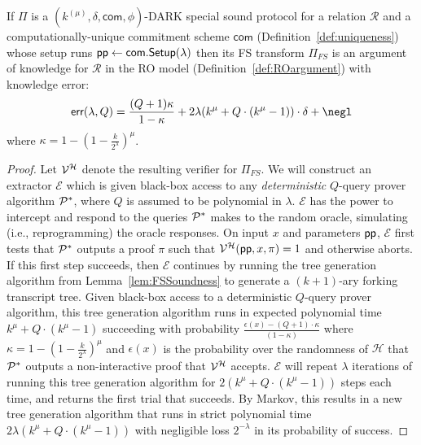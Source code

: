 \begin{theorem}
	If $\Pi$ is a $(k^{(\mu)}, \delta, \textsf{com} , \phi)$-DARK special sound protocol for a relation $\mathcal{R}$ and a computationally-unique commitment scheme $\textsf{com}$ (Definition~\ref{def:uniqueness}) whose setup runs $\textsf{pp} \gets \textsf{com}.\textsf{{Setup}}(\lambda)$ then its FS transform $\Pi_{FS}$ is an argument of knowledge for $\mathcal{R}$ in the RO model (Definition~\ref{def:ROargument}) with knowledge error: 
	 $$\textsf{err}(\lambda, Q) = \frac{(Q+1)\kappa}{1- \kappa}  + 2\lambda (k^\mu + Q \cdot (k^\mu - 1)) \cdot \delta + \negl
 $$ where $\kappa = 1 - (1 - \frac{k}{2^\lambda})^\mu$.
	\end{theorem}
	\begin{proof}
	Let $\mathcal{V}^\mathcal{H}$ denote the resulting verifier for $\Pi_{FS}$. We will construct an extractor $\mathcal{E}$ which is given black-box access to any \emph{deterministic} $Q$-query prover algorithm $\mathcal{P}^*$, where $Q$ is assumed to be polynomial in $\lambda$. $\mathcal{E}$ has the power to intercept and respond to the queries $\mathcal{P}^*$ makes to the random oracle, simulating (i.e., reprogramming) the oracle responses. On input $x$ and parameters $\textsf{pp}$, $\mathcal{E}$ first tests that $\mathcal{P}^*$ outputs a proof $\pi$ such that $\mathcal{V}^\mathcal{H}(\textsf{pp}, x, \pi) = 1$ and otherwise aborts. If this first step succeeds, then $\mathcal{E}$ continues by running the tree generation algorithm from Lemma~\ref{lem:FSSoundness} to generate a $(k+1)$-ary forking transcript tree. Given black-box access to a deterministic $Q$-query prover algorithm, this tree generation algorithm runs in expected polynomial time $k^\mu + Q \cdot (k^\mu - 1)$ succeeding with probability $\frac{\epsilon(x) - (Q+1) \cdot \kappa }{(1 - \kappa)}$ where $\kappa = 1 - (1 - \frac{k}{2^\lambda})^\mu$ and $\epsilon(x)$ is the probability over the randomness of $\mathcal{H}$ that $\mathcal{P}^*$ outputs a non-interactive proof that $\mathcal{V}^\mathcal{H}$ accepts. $\mathcal{E}$ will repeat $\lambda$ iterations of running this tree generation algorithm for $2 (k^\mu + Q \cdot (k^\mu - 1))$  steps each time, and returns the first trial that succeeds. By Markov, this results in a new tree generation algorithm that runs in strict polynomial time $2\lambda (k^\mu + Q \cdot (k^\mu - 1))$ with negligible loss $2^{-\lambda}$ in its probability of success.
	

\end{proof}
